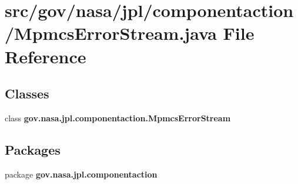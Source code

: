 \section{src/gov/nasa/jpl/componentaction/\+Mpmcs\+Error\+Stream.java File Reference}
\label{_mpmcs_error_stream_8java}
\subsection*{Classes}
\begin{DoxyCompactItemize}
\item 
class {\bf gov.\+nasa.\+jpl.\+componentaction.\+Mpmcs\+Error\+Stream}
\end{DoxyCompactItemize}
\subsection*{Packages}
\begin{DoxyCompactItemize}
\item 
package {\bf gov.\+nasa.\+jpl.\+componentaction}
\end{DoxyCompactItemize}
